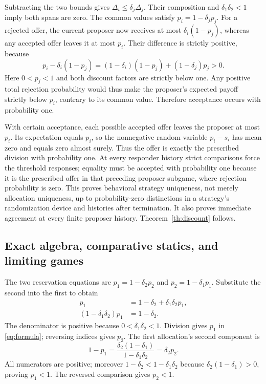 \documentclass[11pt]{article}
\begin{document}
Subtracting the two bounds gives $\Delta_i\le\delta_j\Delta_j$. Their composition and $\delta_1\delta_2<1$ imply both spans are zero. The common values satisfy $p_i=1-\delta_jp_j$. For a rejected offer, the current proposer now receives at most $\delta_i(1-p_j)$, whereas any accepted offer leaves it at most $p_i$. Their difference is strictly positive, because
\begin{equation}\label{eq:gapdiscount}
 p_i-\delta_i(1-p_j)
 =(1-\delta_i)(1-p_j)+(1-\delta_j)p_j>0.
\end{equation}
Here $0<p_j<1$ and both discount factors are strictly below one. Any positive total rejection probability would thus make the proposer's expected payoff strictly below $p_i$, contrary to its common value. Therefore acceptance occurs with probability one.

With certain acceptance, each possible accepted offer leaves the proposer at most $p_i$. Its expectation equals $p_i$, so the nonnegative random variable $p_i-s_i$ has mean zero and equals zero almost surely. Thus the offer is exactly the prescribed division with probability one. At every responder history strict comparisons force the threshold responses; equality must be accepted with probability one because it is the prescribed offer in that preceding proposer subgame, where rejection probability is zero. This proves behavioral strategy uniqueness, not merely allocation uniqueness, up to probability-zero distinctions in a strategy's randomization device and histories after termination. It also proves immediate agreement at every finite proposer history. Theorem~\ref{th:discount} follows.

\subsection{Exact algebra, comparative statics, and limiting games}\label{app:algebra}
The two reservation equations are $p_1=1-\delta_2p_2$ and $p_2=1-\delta_1p_1$. Substitute the second into the first to obtain
\begin{align}
 p_1&=1-\delta_2+\delta_1\delta_2p_1,\\
 (1-\delta_1\delta_2)p_1&=1-\delta_2.
\end{align}
The denominator is positive because $0<\delta_1\delta_2<1$. Division gives $p_1$ in \eqref{eq:formula}; reversing indices gives $p_2$. The first allocation's second component is
\begin{equation}
 1-p_1=\frac{\delta_2(1-\delta_1)}{1-\delta_1\delta_2}=\delta_2p_2.
\end{equation}
All numerators are positive; moreover $1-\delta_2<1-\delta_1\delta_2$ because $\delta_2(1-\delta_1)>0$, proving $p_1<1$. The reversed comparison gives $p_2<1$.
\end{document}
